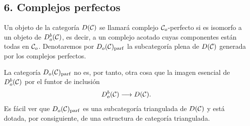 \subsection*{6. Complejos perfectos}

Un objeto de la categoría $D(\mathcal C)$ se llamará complejo $\mathcal C_o$-perfecto si es isomorfo a un objeto de $D_o^b(\mathcal C)$, es decir, a un complejo acotado cuyas componentes están todas en $\mathcal C_o$. Denotaremos por $D_o(\mathcal C)_{\mathrm{parf}}$ la subcategoría plena de $D(\mathcal C)$ generada por los complejos perfectos.

La categoría $D_o(\mathcal C)_{\mathrm{parf}}$ no es, por tanto, otra cosa que la imagen esencial de $D_o^b(\mathcal C)$ por el funtor de inclusión
\[
D_o^b(\mathcal C)\longrightarrow D(\mathcal C).
\]
Es fácil ver que $D_o(\mathcal C)_{\mathrm{parf}}$ es una subcategoría triangulada de $D(\mathcal C)$ y está dotada, por consiguiente, de una estructura de categoría triangulada.
